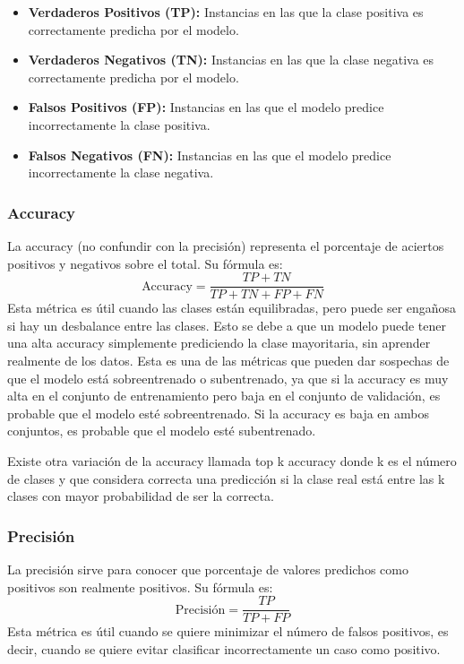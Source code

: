 \begin{itemize}
	\item \textbf{Verdaderos Positivos (TP):} Instancias en las que la clase positiva es correctamente predicha por el modelo.
	\item \textbf{Verdaderos Negativos (TN):} Instancias en las que la clase negativa es correctamente predicha por el modelo.
	\item \textbf{Falsos Positivos (FP):} Instancias en las que el modelo predice incorrectamente la clase positiva.
	\item \textbf{Falsos Negativos (FN):} Instancias en las que el modelo predice incorrectamente la clase negativa.
\end{itemize}

\subsubsection{Accuracy}

La accuracy (no confundir con la precisión) representa el porcentaje de aciertos positivos y negativos sobre el total.
Su fórmula es:
\begin{equation}
	\text{Accuracy} = \frac{TP + TN}{TP + TN + FP + FN}
\end{equation}
Esta métrica es útil cuando las clases están equilibradas, pero puede ser engañosa si hay un desbalance entre las clases.
Esto se debe a que un modelo puede tener una alta accuracy simplemente prediciendo la clase mayoritaria, sin aprender realmente de los datos.
Esta es una de las métricas que pueden dar sospechas de que el modelo está sobreentrenado o subentrenado, ya que si la accuracy es muy alta en el conjunto de entrenamiento pero baja en el conjunto de validación, es probable que el modelo esté sobreentrenado.
Si la accuracy es baja en ambos conjuntos, es probable que el modelo esté subentrenado.

Existe otra variación de la accuracy llamada top k accuracy donde k es el número de clases y que considera correcta una predicción si la clase real está entre las k clases con mayor probabilidad de ser la correcta.

\subsubsection{Precisión}

La precisión sirve para conocer que porcentaje de valores predichos como positivos son realmente positivos.
Su fórmula es:
\begin{equation}
	\text{Precisión} = \frac{TP}{TP + FP}
\end{equation}
Esta métrica es útil cuando se quiere minimizar el número de falsos positivos, es decir, cuando se quiere evitar clasificar incorrectamente un caso como positivo.


